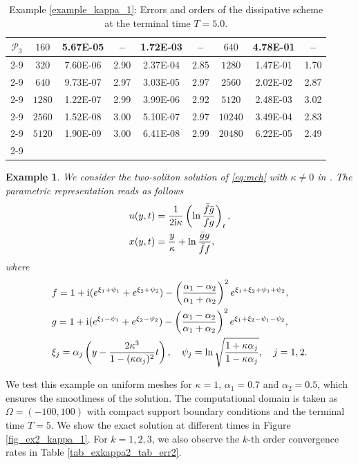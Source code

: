 \documentclass[11pt]{article}
\newtheorem{exmp}{Example}[section]
\numberwithin{equation}{section}
\begin{document}
\begin{table}[!ht]
\begin{tabular}{|c|c|cc|cc|c|cc|}
\multirow{6}{0.6cm}{$\mathcal{P}_3$}& $  160$ &    5.67E-05&	  --  &    1.72E-03&      --    & $  640$ &    4.78E-01&      --  \\ \cline{2-9}
									& $  320$ &    7.60E-06&     2.90 &    2.37E-04&     2.85	& $ 1280$ &    1.47E-01&     1.70	 \\ \cline{2-9}
									& $  640$ &    9.73E-07&     2.97 &    3.03E-05&     2.97	& $ 2560$ &    2.02E-02&     2.87	 \\ \cline{2-9}
									& $ 1280$ &    1.22E-07&     2.99 &    3.99E-06&     2.92	& $ 5120$ &    2.48E-03&     3.02	 \\ \cline{2-9}
									& $ 2560$ &    1.52E-08&     3.00 &    5.10E-07&     2.97	& $10240$ &    3.49E-04&     2.83	 \\ \cline{2-9}
									& $ 5120$ &    1.90E-09&     3.00 &    6.41E-08&     2.99	& $20480$ &    6.22E-05&     2.49	 \\ \cline{2-9} \hline
\end{tabular}

\caption{ Example \ref{example_kappa_1}: Errors and orders of the dissipative scheme at the terminal time $T=5.0$. }\label{tab_exkappa1_tab_err2}

\end{table}
\begin{exmp}\label{example_kappa_2}
We consider the two-soliton solution of \eqref{eq:mch} with $\kappa\neq0$ in \cite{MatsunoJPA2014}. The parametric representation reads as follows
\begin{align*}
&u(y,t)=\frac{1}{2{\rm i} \kappa}\left(\ln\frac{\bar{f}\bar{g}}{fg}\right)_t,\\
&x(y,t)=\frac{y}{\kappa}+\ln \frac{\bar{g}{g}}{\bar{f}f},
\end{align*}
where
\begin{align*}
&f=1+{\rm i}(e^{\xi_1+\psi_1}+e^{\xi_2+\psi_2})-\left(\frac{\alpha_1-\alpha_2}{\alpha_1+\alpha_2}\right)^2e^{\xi_1+\xi_2+\psi_1+\psi_2},\\
&g=1+{\rm i}(e^{\xi_1-\psi_1}+e^{\xi_2-\psi_2})-\left(\frac{\alpha_1-\alpha_2}{\alpha_1+\alpha_2}\right)^2e^{\xi_1+\xi_2-\psi_1-\psi_2},\\
&\xi_j=\alpha_j\left(y-\frac{2\kappa^3}{1-(\kappa \alpha_j)^2}t\right),\quad \psi_j=\ln\sqrt{\frac{1+\kappa \alpha_j}{1-\kappa \alpha_j}},\quad j=1,2.
\end{align*}
\end{exmp}

We test this example on uniform meshes for $\kappa=1$, $\alpha_1=0.7$ and $\alpha_2=0.5$, which ensures the smoothness of the solution. The computational domain is taken as $\Omega=(-100,100)$ with compact support boundary conditions and the terminal time $T=5$. We show the exact solution at different times in Figure \ref{fig_ex2_kappa_1}. For $k=1,2,3$, we also observe the $k$-th order convergence rates in Table \ref{tab_exkappa2_tab_err2}. 
\end{document}
